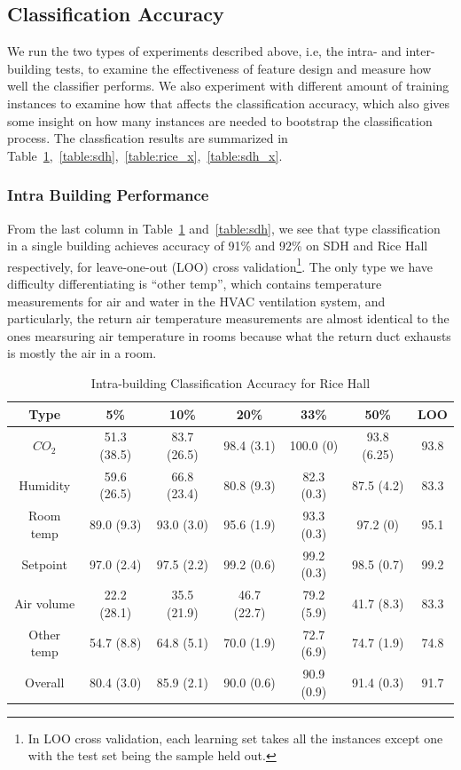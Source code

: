 \subsection{Classification Accuracy}
We run the two types of experiments described above, i.e, the intra- and inter- building tests, to examine the effectiveness of feature design and measure how well 
the classifier performs. We also experiment with different amount of training instances to examine how that affects the classification accuracy, which also gives 
some insight on how many instances are needed to bootstrap the classification process. The classfication results are summarized in Table~\ref{table:rice},~\ref{table:sdh},~\ref{table:rice_x},~\ref{table:sdh_x}.

\subsubsection{Intra Building Performance}
From the last column in Table~\ref{table:rice} and~\ref{table:sdh}, we see that type classification in a single building achieves accuracy of 91\% and 92\% on SDH and Rice Hall respectively, for leave-one-out (LOO) cross validation\footnote{In LOO cross validation, each learning set takes all the instances except one with the test set being the sample held out.}. The only type we have difficulty differentiating is ``other temp'', which contains temperature measurements for air and water in the HVAC ventilation system, and particularly, the return air temperature measurements are almost identical to the ones mearsuring air temperature in rooms because what the return duct exhausts is mostly the air in a room.

\begin{table}[ht!]
\caption{Intra-building Classification Accuracy for Rice Hall}
\centering %
\begin{tabular}{c | c | c | c | c | c | c}%
\hline %
Type & 5\% & 10\% & 20\% & 33\% & 50\% & LOO\\ %
\hline\hline %
$CO_{2}$ & 51.3 (38.5) & 83.7 (26.5) & 98.4 (3.1) & 100.0 (0) & 93.8 (6.25) & 93.8\\ \hline
Humidity & 59.6 (26.5) & 66.8 (23.4) & 80.8 (9.3) & 82.3 (0.3) & 87.5 (4.2) & 83.3\\ \hline
Room temp & 89.0 (9.3) & 93.0 (3.0) & 95.6 (1.9) & 93.3 (0.3) & 97.2 (0) & 95.1\\ \hline
Setpoint & 97.0 (2.4) & 97.5 (2.2) & 99.2 (0.6) & 99.2 (0.3) & 98.5 (0.7) & 99.2\\ \hline
Air volume & 22.2 (28.1) & 35.5 (21.9) & 46.7 (22.7) & 79.2 (5.9) & 41.7 (8.3) & 83.3\\ \hline
Other temp & 54.7 (8.8) & 64.8 (5.1) & 70.0 (1.9) & 72.7 (6.9) & 74.7 (1.9) & 74.8\\ \hline
Overall & 80.4 (3.0) & 85.9 (2.1) & 90.0 (0.6) & 90.9 (0.9) & 91.4 (0.3) & 91.7\\ \hline
\end{tabular}
\label{table:rice} %
\end{table}

